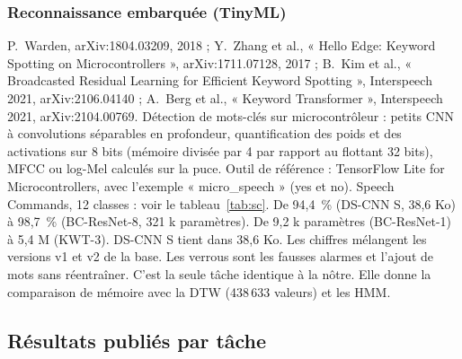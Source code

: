 \subsubsection*{Reconnaissance embarquée (TinyML)}
\fichemodele
{P.~Warden, arXiv:1804.03209, 2018 ; Y.~Zhang et al., « Hello Edge: Keyword Spotting on Microcontrollers », arXiv:1711.07128, 2017 ; B.~Kim et al., « Broadcasted Residual Learning for Efficient Keyword Spotting », Interspeech 2021, arXiv:2106.04140 ; A.~Berg et al., « Keyword Transformer », Interspeech 2021, arXiv:2104.00769.}
{Détection de mots-clés sur microcontrôleur : petits CNN à convolutions séparables en profondeur, quantification des poids et des activations sur 8 bits (mémoire divisée par 4 par rapport au flottant 32 bits), MFCC ou log-Mel calculés sur la puce. Outil de référence : TensorFlow Lite for Microcontrollers, avec l'exemple « micro\_speech » (yes et no).}
{Speech Commands, 12 classes : voir le tableau~\ref{tab:sc}. De 94,4~\% (DS-CNN S, 38,6 Ko) à 98,7~\% (BC-ResNet-8, 321 k paramètres).}
{De 9,2 k paramètres (BC-ResNet-1) à 5,4 M (KWT-3). DS-CNN S tient dans 38,6 Ko.}
{Les chiffres mélangent les versions v1 et v2 de la base. Les verrous sont les fausses alarmes et l'ajout de mots sans réentraîner.}
{C'est la seule tâche identique à la nôtre. Elle donne la comparaison de mémoire avec la DTW (438\,633 valeurs) et les HMM.}

\subsection{Résultats publiés par tâche}

